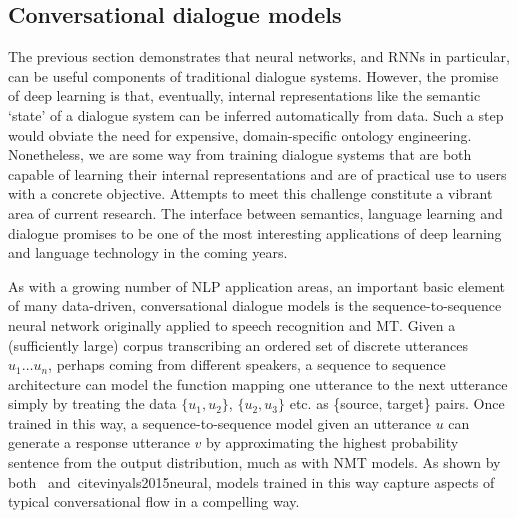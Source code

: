 \documentclass[11pt,letterpaper]{article}
\begin{document}
\subsection{Conversational dialogue models}
The previous section demonstrates that neural networks, and RNNs in particular, can be useful components of traditional dialogue systems. However, the promise of deep learning is that, eventually, internal representations like the semantic `state' of a dialogue system can be inferred automatically from data. Such a step would  obviate the need for expensive, domain-specific ontology engineering. Nonetheless, we are some way from training dialogue systems that are both capable of learning their internal representations and are of practical use to users with a concrete objective. Attempts to meet this challenge constitute a vibrant area of current research. The interface between semantics, language learning and dialogue promises to be one of the most interesting applications of deep learning and language technology in the coming years. 

As with a growing number of NLP application areas, an important basic element of many data-driven, conversational dialogue models is the sequence-to-sequence neural network originally applied to speech recognition and MT. Given a (sufficiently large) corpus transcribing an ordered set of discrete utterances \(u_1 \dots u_n\), perhaps coming from different speakers, a sequence to sequence architecture can model the function mapping one utterance to the next utterance simply by treating the data \(\{u_1, u_2\}\), \(\{u_2, u_3\}\) etc. as \{source, target\} pairs. Once trained in this way, a sequence-to-sequence model given an utterance \(u\) can generate a response utterance \(v\) by approximating the highest probability sentence from the output distribution, much as with NMT models. As shown by both~\cite{sordoni2015neural} and~cite{vinyals2015neural}, models trained in this way capture aspects of typical conversational flow in a compelling way. 
\end{document}
